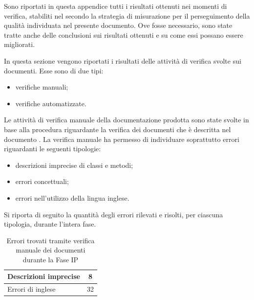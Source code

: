
	Sono riportati in questa appendice tutti i risultati ottenuti nei momenti di verifica, stabiliti nel  secondo la strategia di misurazione per il perseguimento della qualità individuata nel presente documento. Ove fosse necessario, sono state tratte anche delle conclusioni sui risultati ottenuti e su come essi possano essere migliorati.

			In questa sezione vengono riportati i risultati delle attività di verifica svolte sui documenti. Esse sono di due tipi:
			\begin{itemize}
				\item verifiche manuali;
				\item verifiche automatizzate.
			\end{itemize}
				Le attività di verifica manuale della documentazione prodotta sono state svolte in base alla procedura riguardante la verifica dei documenti che è descritta nel documento .
				La verifica manuale ha permesso di individuare soprattutto errori riguardanti le seguenti tipologie:
				\begin{itemize}
					\item descrizioni imprecise di classi e metodi;
					\item errori concettuali;
					\item errori nell'utilizzo della lingua inglese.
				\end{itemize}
				Si riporta di seguito la quantità degli errori rilevati e risolti, per ciascuna tipologia, durante l'intera fase.
				\begin{table}[H]
					\centering
						\begin{tabu}{| l | c |}
							\hline
								Descrizioni imprecise	&	8\\ \hline
								Errori di inglese  &  32\\ \hline
						\end{tabu}
						\caption{Errori trovati tramite verifica manuale dei documenti durante la Fase IP}
				\end{table}


